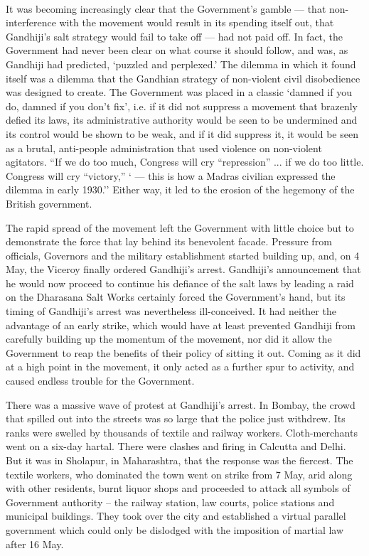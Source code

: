 \begin{multicols}{2}
\paragraph*{}
It was becoming increasingly clear that the Government's gamble --- that non-interference with the movement would result in its spending itself out, that Gandhiji's salt strategy would fail to take off --- had not paid off. In fact, the Government had never been clear on what course it should follow, and was, as Gandhiji had predicted, `puzzled and perplexed.' The dilemma in which it found itself was a dilemma that the Gandhian strategy of non-violent civil disobedience was designed to create. The Government was placed in a classic `damned if you do, damned if you don't fix', i.e. if it did not suppress a movement that brazenly defied its laws, its administrative authority would be seen to be undermined and its control would be shown to be weak, and if it did suppress it, it would be seen as a brutal, anti-people administration that used violence on non-violent agitators. ``If we do too much, Congress will cry ``repression'' ... if we do too little. Congress will cry ``victory,'' ` --- this is how a Madras civilian expressed the dilemma in early 1930.'' Either way, it led to the erosion of the hegemony of the British government.

The rapid spread of the movement left the Government with little choice but to demonstrate the force that lay behind its benevolent facade. Pressure from officials, Governors and the military establishment started building up, and, on 4 May, the Viceroy finally ordered Gandhiji's arrest. Gandhiji's announcement that he would now proceed to continue his defiance of the salt laws by leading a raid on the Dharasana Salt Works certainly forced the Government's hand, but its timing of Gandhiji's arrest was nevertheless ill-conceived. It had neither the advantage of an early strike, which would have at least prevented Gandhiji from carefully building up the momentum of the movement, nor did it allow the Government to reap the benefits of their policy of sitting it out. Coming as it did at a high point in the movement, it only acted as a further spur to activity, and caused endless trouble for the Government.

There was a massive wave of protest at Gandhiji's arrest. In Bombay, the crowd that spilled out into the streets was so large that the police just withdrew. Its ranks were swelled by thousands of textile and railway workers. Cloth-merchants went on a six-day hartal. There were clashes and firing in Calcutta and Delhi. But it was in Sholapur, in Maharashtra, that the response was the fiercest. The textile workers, who dominated the town went on strike from 7 May, arid along with other residents, burnt liquor shops and proceeded to attack all symbols of Government authority -- the railway station, law courts, police stations and municipal buildings. They took over the city and established a virtual parallel government which could only be dislodged with the imposition of martial law after 16 May.


\end{multicols}
